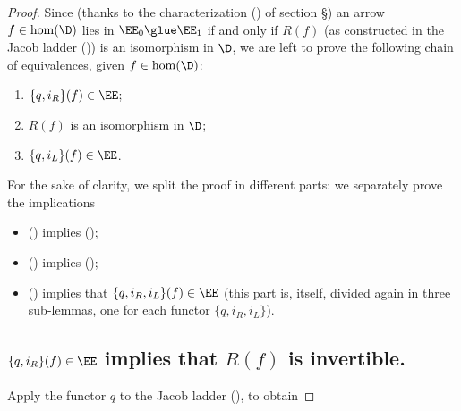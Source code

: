 \begin{proof}
Since (thanks to the characterization () of section \S{}) an arrow $f\in\hom(\D)$ lies in $\EE_0\glue \EE_1$ if and only if $R(f)$ (as constructed in the Jacob ladder ()) is an isomorphism in $\D$, we are left to prove the following chain of equivalences, given $f\in\hom(\D)$:
\begin{enumerate}[label=(\oldstylenums{\arabic*})]
\item $\{q, i_R\}(f)\in \EE$;
\item $R(f)$ is an isomorphism in $\D$;
\item $\{q, i_L\}(f)\in \EE$.
\end{enumerate}
For the sake of clarity, we split the proof in different parts: we separately prove the implications 
\begin{itemize}
\item () implies ();
\item () implies ();
\item () implies that $\{q, i_R, i_L\}(f)\in \EE$ (this part is, itself, divided again in three sub-lemmas, one for each functor $\{q, i_R, i_L\}$).
\end{itemize}
\subsection*{$\{ q, i_R\}(f)\in \EE$ implies that $R(f)$ is invertible.}\label{para:firstsneetch}
Apply the functor $q$ to the Jacob ladder (), to obtain


\end{proof}

